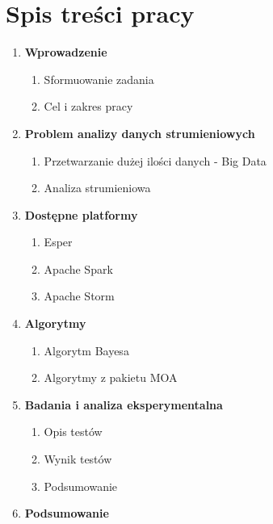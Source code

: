 \documentclass[a4paper,12pt]{scrartcl}
\begin{document}
 \section*{Spis treści pracy}
 \begin{enumerate}
	 \item \textbf{Wprowadzenie}
	 \begin{enumerate}
	 		\item Sformuowanie zadania 
			\item Cel i zakres pracy 
	 \end{enumerate}
	 \item \textbf{Problem analizy danych strumieniowych}
	 \begin{enumerate}
	 	\item Przetwarzanie dużej ilości danych - Big Data 
		\item Analiza strumieniowa 
	 \end{enumerate}
	 \item \textbf{Dostępne platformy}
	 \begin{enumerate}
	 	\item Esper 
		\item Apache Spark 
		\item Apache Storm 
	 \end{enumerate}
	 \item \textbf{Algorytmy}
	 \begin{enumerate}
	 	\item Algorytm Bayesa 
		\item Algorytmy z pakietu MOA 
	 \end{enumerate}
	 \item \textbf{Badania i analiza eksperymentalna}
	 \begin{enumerate}
	 	\item Opis testów 
		\item Wynik testów 
		\item Podsumowanie 
	 \end{enumerate}
	 \item \textbf{Podsumowanie}
 \end{enumerate}
 \newpage
\end{document}

